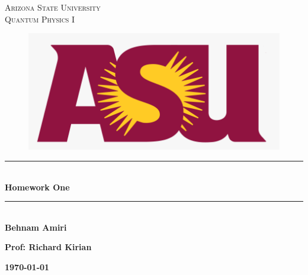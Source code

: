 \documentclass[fleqn]{article}
\begin{document}
  \begin{titlepage}

    \newcommand{\HRule}{\rule{\linewidth}{0.5mm}} %

    \center %



    \textsc{\LARGE Arizona State University}\\[1.5cm] %

    \textsc{\LARGE Quantum Physics I }\\[1.5cm] %


    \begin{figure}
      \includegraphics[width=\linewidth]{asu.png}
    \end{figure}


    \HRule \\[0.4cm]
    { \huge \bfseries Homework One}\\[0.4cm] 
    \HRule \\[1.5cm]

    \textbf{Behnam Amiri}

    \bigbreak

    \textbf{Prof: Richard Kirian}

    \bigbreak


    \textbf{{\large \today}\\[2cm]}

    \vfill %

  \end{titlepage}
\end{document}
